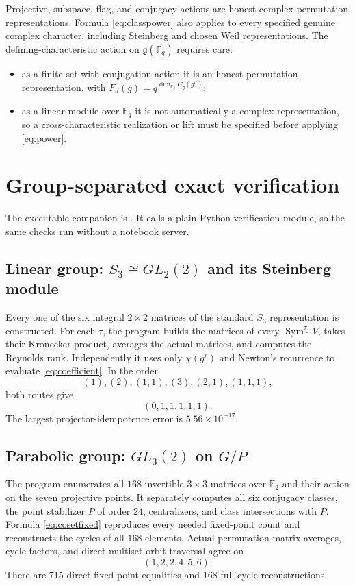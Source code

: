 \documentclass[11pt]{article}
\newcommand{\Sym}{\operatorname{Sym}}
\newcommand{\F}{\mathbb F}
\begin{document}
Projective, subspace, flag, and conjugacy actions are honest complex
permutation representations.  Formula \eqref{eq:classpower} also applies to
every specified genuine complex character, including Steinberg and chosen
Weil representations.  The defining-characteristic action on
$\mathfrak g(\F_q)$ requires care:
\begin{itemize}
\item as a finite set with conjugation action it is an honest permutation
representation, with
$F_d(g)=q^{\dim_{\F_q}C_{\mathfrak g}(g^d)}$;
\item as a linear module over $\F_q$ it is not automatically a complex
representation, so a cross-characteristic realization or lift must be
specified before applying \eqref{eq:power}.
\end{itemize}

\section{Group-separated exact verification}

The executable companion is
.
It calls a plain Python verification module, so the same checks run without a
notebook server.

\subsection{Linear group: $S_3\cong GL_2(2)$ and its Steinberg module}

Every one of the six integral $2\times2$ matrices of the standard $S_3$
representation is constructed.  For each $\tau$, the program builds the
matrices of every $\Sym^{\tau_j}V$, takes their Kronecker product, averages the
actual matrices, and computes the Reynolds rank.  Independently it uses only
$\chi(g^r)$ and Newton's recurrence to evaluate \eqref{eq:coefficient}.  In
the order
\[
(1),(2),(1,1),(3),(2,1),(1,1,1),
\]
both routes give
\[
(0,1,1,1,1,1).
\]
The largest projector-idempotence error is $5.56\times10^{-17}$.

\subsection{Parabolic group: $GL_3(2)$ on $G/P$}

The program enumerates all $168$ invertible $3\times3$ matrices over $\F_2$
and their action on the seven projective points.  It separately computes all
six conjugacy classes, the point stabilizer $P$ of order $24$, centralizers,
and class intersections with $P$.  Formula \eqref{eq:cosetfixed} reproduces
every needed fixed-point count and reconstructs the cycles of all $168$
elements.  Actual permutation-matrix averages, cycle factors, and direct
multiset-orbit traversal agree on
\[
(1,2,2,4,5,6).
\]
There are $715$ direct fixed-point equalities and $168$ full cycle
reconstructions.
\end{document}
